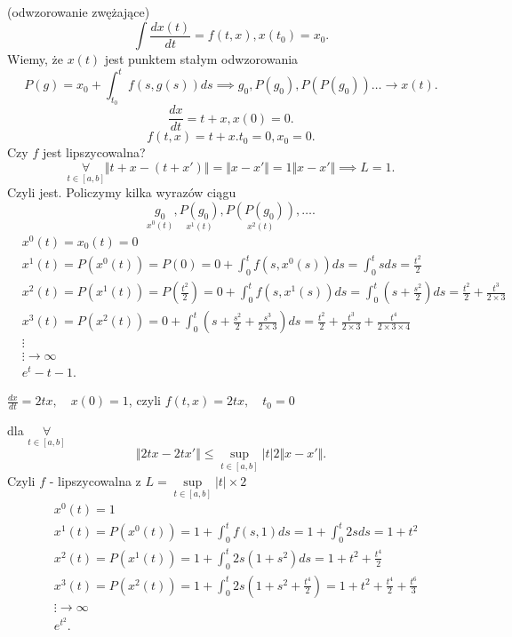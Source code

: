 \documentclass[../main.tex]{subfiles}
\begin{document}
\begin{przyklad}
    (odwzorowanie zwężające)\\
    \[
        \int \frac{dx(t)}{dt} = f(t,x), x(t_0) = x_0
    .\]
    Wiemy, że $x(t)$ jest punktem stałym odwzorowania
    \[
        P(g) = x_0 + \int_{t_0}^{t} f(s,g(s)) ds \implies g_0,P(g_0),P(P(g_0))\ldots\to x(t)
    .\]
    \[
        \frac{dx}{dt} = t+x, x(0) = 0
    .\]
    \[
        f(t,x) = t+x. t_0 = 0, x_0 = 0
    .\]
    Czy $f$ jest lipszycowalna?
    \[
        \underset{t\in [a,b]}{\forall} \Vert t+x - (t+x') \Vert = \Vert x-x' \Vert = 1 \Vert x-x' \Vert \implies L = 1
    .\]
    Czyli jest. Policzymy kilka wyrazów ciągu
    \[
        \underset{x^0(t)}{g_0},\underset{x^1(t)}{P(g_0)}, \underset{x^2(t)}{P(P(g_0))},\ldots
    .\]
    \begin{align*}
        &x^0(t) = x_0(t) = 0\\
        &x^1(t) = P(x^0(t)) = P(0) = 0 + \int_0^t f(s,x^0(s))ds = \int_0^t s ds = \frac{t^2}{2}\\
        &x^2(t) = P(x^1(t)) = P(\frac{t^2}{2}) = 0 + \int_0^t f(s,x^1(s)) ds = \int_0^t (s+\frac{s^2}{2})ds = \frac{t^2}{2} + \frac{t^3}{2 \times 3}\\
        &x^3(t) = P(x^2(t)) = 0 + \int_0^t \left(s+\frac{s^2}{2}+\frac{s^3}{2\times 3} \right)ds  = \frac{t^2}{2}+\frac{t^3}{2\times 3}+\frac{t^4}{2\times 3\times 4}\\
        &\vdots\\
        &\vdots \to \infty\\
        &e^t - t - 1
    .\end{align*}
\end{przyklad}
\begin{przyklad}

    $\frac{dx}{dt} = 2tx,\quad x(0) = 1$, czyli $f(t,x) = 2tx,\quad t_0 = 0$

    dla $\underset{t\in[a,b]}{\forall} $
    \[
        \Vert 2tx - 2tx' \Vert \le \underset{t\in[a,b]}{\sup} |t| 2 \Vert x-x' \Vert
    .\] Czyli $f$ - lipszycowalna z $L = \underset{t\in[a,b]}{\sup} |t| \times 2$
    \begin{align*}
        &x^0(t) = 1\\
        &x^1(t) = P(x^0(t)) = 1 + \int_0^t f(s,1)ds = 1 + \int_0^t 2sds = 1+t^2\\
        &x^2(t) = P(x^1(t)) = 1 + \int_0^t 2s(1+s^2)ds = 1 + t^2 + \frac{t^4}{2}\\
        &x^3(t) = P(x^2(t)) = 1 + \int_0^t 2s(1+s^2 + \frac{t^4}{2}) =  1 + t^2 + \frac{t^4}{2} + \frac{t^6}{3}\\
        &\vdots \to \infty\\
        &e^{t^2}
    .\end{align*}
\end{przyklad}
\end{document}
